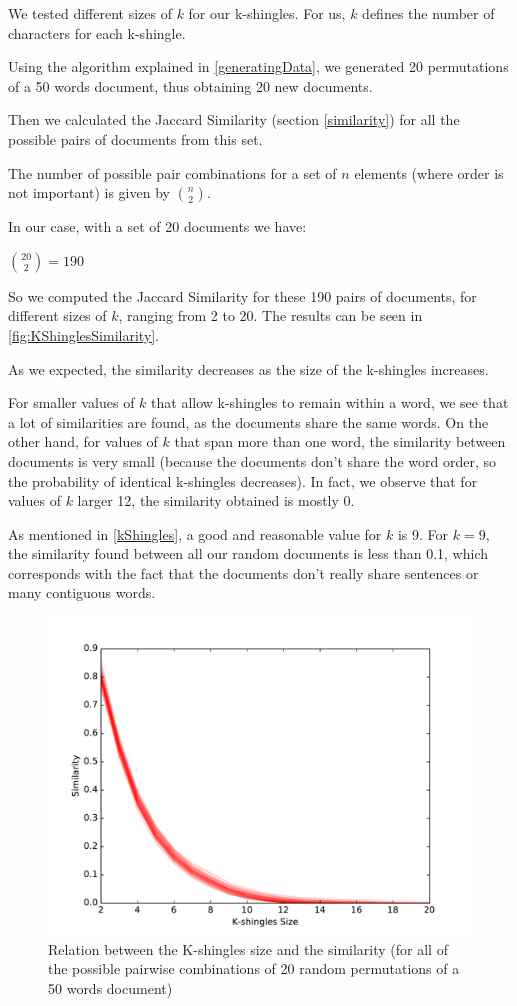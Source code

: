 \documentclass[12pt]{article}
\begin{document}
We tested different sizes of $k$ for our k-shingles.
For us, $k$ defines the number of characters for each k-shingle.

Using the algorithm explained in \autoref{generatingData}, we generated 20 permutations of a 50 words document, thus obtaining 20 new documents.

Then we calculated the Jaccard Similarity (section \ref{similarity}) for all the possible pairs of documents from this set.

The number of possible pair combinations for a set of $n$ elements (where order is not important) is given by $\binom{n}{2}$.

In our case, with a set of 20 documents we have:
\bigbreak
\centerline{\large $\binom{20}{2} = 190$}
\bigbreak

So we computed the Jaccard Similarity for these 190 pairs of documents, for different sizes of $k$, ranging from 2 to 20. The results can be seen in \autoref{fig:KShinglesSimilarity}.

\bigbreak
As we expected, the similarity decreases as the size of the k-shingles increases.

For smaller values of $k$ that allow k-shingles to remain within a word, we see that a lot of similarities are found, as the documents share the same words.
On the other hand, for values of $k$ that span more than one word, the similarity between documents is very small (because the documents don't share the word order, so the probability of identical k-shingles decreases).
In fact, we observe that for values of $k$ larger 12, the similarity obtained is mostly 0.

As mentioned in \autoref{kShingles}, a good and reasonable value for $k$ is 9.
For $k = 9$, the similarity found between all our random documents is less than 0.1, which corresponds with the fact that the documents don't really share sentences or many contiguous words.

\begin{figure}[H]
	\centering
	\includegraphics[scale=0.5]{graphs/JaccardSimilarityValueKshingles.pdf} 
	\caption{Relation between the K-shingles size and the similarity (for all of the possible pairwise combinations of 20 random permutations of a 50 words document)}
	\label{fig:KShinglesSimilarity}
\end{figure}
\end{document}
